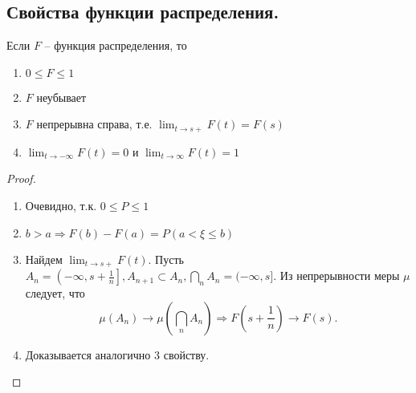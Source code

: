 \subsection{Свойства функции распределения.}
\begin{theorem}
    Если $F$ -- функция распределения, то
    \begin{enumerate}
        \item $0 \leqslant F \leqslant 1$
        \item $F$ неубывает
        \item $F$ непрерывна справа, т.е. $\lim_{t \to s+} F(t) = F(s)$
        \item $\lim_{t \to -\infty} F(t) = 0$ и $\lim_{t \to \infty} F(t) = 1$
    \end{enumerate}
    \begin{proof}
        \text{}
        \begin{enumerate}
            \item Очевидно, т.к. $0 \leqslant P \leqslant 1$
            \item $b > a \Rightarrow F(b) - F(a) = P(a < \xi \leqslant b)$
            \item Найдем $\lim_{t \to s+} F(t)$. Пусть
            $
                A_n = \left( -\infty, s + \frac{1}{n} \right], A_{n+1} \subset A_n, \bigcap_n A_n  = (-\infty, s].
            $
            Из непрерывности меры $\mu$ следует, что
            \[
                \mu(A_n) \to \mu \left( \bigcap_n A_n \right)
                \Rightarrow
                F \left( s + \frac{1}{n} \right) \to F(s).
            \]
            \item Доказывается аналогично 3 свойству.
        \end{enumerate}
    \end{proof}
\end{theorem}